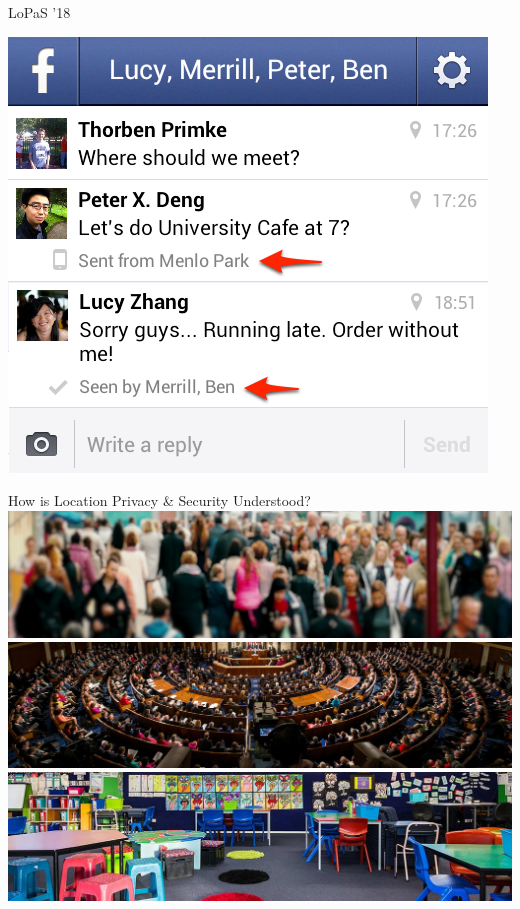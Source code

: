 \documentclass[10pt]{beamer}
\begin{document}
\begin{frame}{LoPaS '18}
\begin{minipage}[c]{0.34\textwidth}
			\vspace{5mm}
			
			\includegraphics[width=\textwidth]{figures/screen3.jpg}
		\end{minipage}
	\end{frame}

	\begin{frame}{How is Location Privacy \& Security Understood?}
			\includegraphics[width=\textwidth]{figures/people.png}
			\pause
			\includegraphics[width=\textwidth]{figures/congress.jpg}
			\pause
			\includegraphics[width=\textwidth]{figures/kids.jpg}
	\end{frame}
\end{document}
